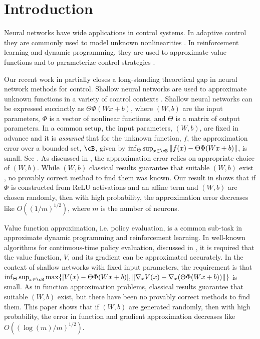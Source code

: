 \documentclass[letterpaper, 10 pt, conference]{ieeeconf}  %
\begin{document}
\section{Introduction}

Neural networks have wide applications in control systems. In adaptive control they are commonly used to model unknown nonlinearities \cite{lavretsky2013robust}. In reinforcement learning and dynamic programming, they are used to approximate value functions and to parameterize control strategies \cite{vrabie2013optimal,powell2007approximate,sutton2018reinforcement}.



Our recent work in \cite{lamperski2024approximation} partially closes a long-standing theoretical gap in neural network methods for control. 
Shallow neural networks are used to approximate unknown functions in a variety of control contexts \cite{vrabie2013optimal,kamalapurkar2018reinforcement,greene2023deep,makumi2023approximate,cohen2023safe,kokolakis2023reachability,sung2023robust,lian2024inverse}.
Shallow neural networks can be expressed succinctly as $\Theta\Phi(Wx+b)$, where $(W,b)$ are the input parameters, $\Phi$ is a vector of nonlinear functions, and $\Theta$ is a matrix of output parameters. In a common setup, the input parameters, $(W,b)$, are fixed in advance and it is \emph{assumed} that for the unknown function, $f$, the approximation error over a bounded set, $\cB$, given by $\inf_{\Theta}\sup_{x\in \cB}\|f(x)-\Theta\Phi(Wx+b)\|$, is small.  
See \cite{vrabie2013optimal,kamalapurkar2018reinforcement,greene2023deep,makumi2023approximate,cohen2023safe,kokolakis2023reachability,sung2023robust,lian2024inverse}. As discussed in \cite{soudbakhsh2023data,annaswamy2023adaptive}, the approximation error relies on appropriate choice of $(W,b)$. While $(W,b)$ classical results guarantee that suitable $(W,b)$ exist \cite{pinkus1999approximation}, no provably correct method to find them was known. Our result in \cite{lamperski2024approximation} shows that if $\Phi$ is constructed from ReLU activations and an affine term and $(W,b)$ are chosen randomly, then with high probability, the approximation error decreases like $O\left((1/m)^{1/2}\right)$, where $m$ is the number of neurons. 

Value function approximation, i.e. policy evaluation, is a common sub-task in approximate dynamic programming and reinforcement learning. In well-known algorithms for continuous-time policy evaluation, discussed in \cite{vrabie2013optimal,kamalapurkar2018reinforcement}, it is required that the value function, $V$, and its gradient can be approximated accurately. In the context of shallow networks with fixed input parameters, the requirement is that
$\inf_{\Theta}\sup_{x\in\cB}\max\{|V(x)-\Theta \Phi(Wx+b)|,\|\nabla_x V(x)-\nabla_x(\Theta\Phi(Wx+b))\|\}$ is small. As in function approximation problems, classical results guarantee that suitable $(W,b)$ exist, but there have been no provably correct methods to find them. This paper shows that if $(W,b)$ are generated randomly, then with high probability, the error in function and gradient approximation decreases like $O\left((\log(m)/m)^{1/2}\right)$.
\end{document}
